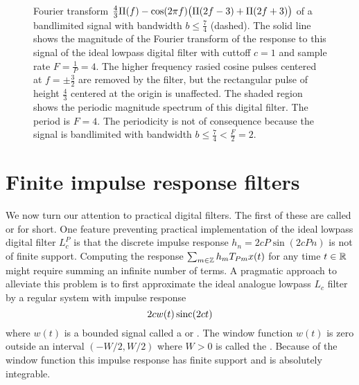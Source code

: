 \begin{figure}[tp]
  \caption{Fourier transform $\tfrac{4}{3}\Pi(f) - \cos(2\pi f) \big( \Pi(2f - 3) + \Pi(2f + 3) \big)$ of a bandlimited signal with bandwidth $b \leq \tfrac{7}{4}$ (dashed). The solid line shows the magnitude of the Fourier transform of the response to this signal of the ideal lowpass digital filter with cuttoff $c=1$ and sample rate $F = \tfrac{1}{P} = 4$.  %
The higher frequency rasied cosine pulses centered at $f = \pm \tfrac{3}{2}$ are removed by the filter, but the rectangular pulse of height $\tfrac{4}{3}$ centered at the origin is unaffected.  The shaded region shows the periodic magnitude spectrum of this digital filter.  The period is $F = 4$. The periodicity is not of consequence because the signal is bandlimited with bandwidth $b \leq \tfrac{7}{4} < \tfrac{F}{2} = 2$.} \label{fig:bandlimiteddiscretetimefiltering}
\end{figure}


\section{Finite impulse response filters}\label{sec:finite-impulse-resp}

We now turn our attention to practical digital filters.  The first of these are called  or  for short.  One feature preventing practical implementation of the ideal lowpass digital filter $L_c^P$ is that the discrete impulse response $h_n = 2cP\sin(2cPn)$ is not of finite support.  Computing the response $\sum_{m \in {\mathbb Z}} h_m T_{Pm} x(t)$ for any time $t \in {\mathbb R}$ might require summing an infinite number of terms.  A pragmatic approach to alleviate this problem is to first approximate the ideal analogue lowpass $L_c$ filter by a regular system with impulse response
\[
2c w(t) \operatorname{sinc}(2ct)
\]
where $w(t)$ is a bounded signal called a  or .  The window function $w(t)$ is zero outside an interval $(-W/2, W/2)$ where $W > 0$ is called the .  Because of the window function this impulse response has finite support and is absolutely integrable.  

